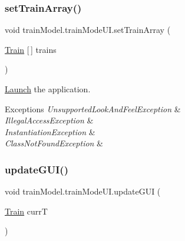 \mbox{\label{classtrainModel_1_1trainModeUI_a1d48455d0f924646325ee06eb4dd576d}} 
\subsubsection{\texorpdfstring{set\+Train\+Array()}{setTrainArray()}}
{\footnotesize\ttfamily void train\+Model.\+train\+Mode\+U\+I.\+set\+Train\+Array (\begin{DoxyParamCaption}\item[{\hyperlink{classtrainModel_1_1Train}{Train} \mbox{[}$\,$\mbox{]}}]{trains }\end{DoxyParamCaption})}



\hyperlink{classtrainModel_1_1Launch}{Launch} the application. 


\begin{DoxyExceptions}{Exceptions}
{\em Unsupported\+Look\+And\+Feel\+Exception} & \\
\hline
{\em Illegal\+Access\+Exception} & \\
\hline
{\em Instantiation\+Exception} & \\
\hline
{\em Class\+Not\+Found\+Exception} & \\
\hline
\end{DoxyExceptions}
\mbox{\label{classtrainModel_1_1trainModeUI_a1bb320064d891a9e4dfb26497f4c9d02}} 
\subsubsection{\texorpdfstring{update\+G\+U\+I()}{updateGUI()}}
{\footnotesize\ttfamily void train\+Model.\+train\+Mode\+U\+I.\+update\+G\+UI (\begin{DoxyParamCaption}\item[{\hyperlink{classtrainModel_1_1Train}{Train}}]{currT }\end{DoxyParamCaption})}



